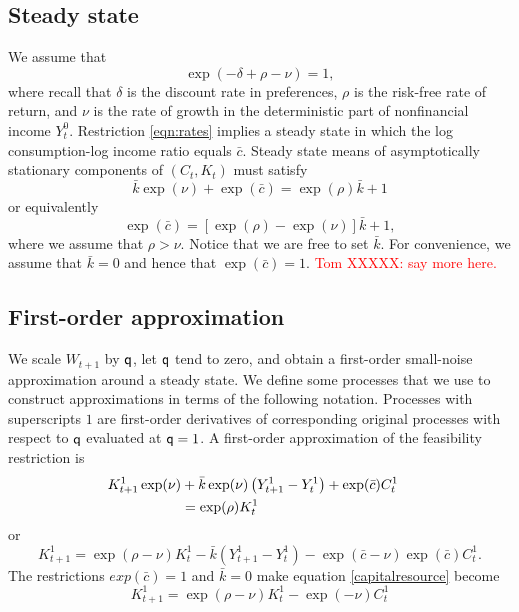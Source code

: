 \documentclass[12pt]{article}
\begin{document}
\subsection{Steady state}

We assume that
\begin{equation}\label{eqn:rates}
\exp(-\delta + \rho - \nu) = 1,
\end{equation}
where recall that $\delta$ is the discount rate in preferences, $\rho$ is the risk-free  rate of return, and $\nu$ is the rate of growth in the deterministic
part of nonfinancial income $Y_t^0$.  Restriction \eqref{eqn:rates} implies  a steady state in  which the  log consumption-log income ratio equals  ${\bar c}$.
Steady state means of asymptotically stationary components of $(C_t, K_t)$ must satisfy
\[
{\bar k}\exp(\nu) + \exp({\bar c})  = \exp(\rho) {\bar k} + 1
\]
or equivalently
\[
 \exp({\bar c}) = \left[\exp( \rho) - \exp(\nu)\right] {\bar k} + 1 ,
\]
where we assume that $\rho > \nu$.  Notice that we are free to set ${\bar k}$.
For convenience, we assume that ${\bar k} = 0$ and hence that $\exp({\bar c}) = 1$.
\textcolor{red}{Tom XXXXX: say more here.}

\subsection{First-order approximation}
We  scale $W_{t+1}$ by ${\sf q}$, let ${\sf q }$ tend to zero, and obtain a first-order small-noise approximation around a steady state.
We define some processes that we use to construct approximations in terms of the following notation.  Processes with superscripts $1$ are  first-order derivatives of corresponding original processes  with respect to ${\sf q}$ evaluated at ${\sf q}=1$.  A first-order approximation of
the feasibility restriction is 
\begin{align*}
K_{t+1}^1\exp(\nu) &+ {\bar k}\exp(\nu)\left(Y_{t+1}^1 - Y_t^1 \right)  + \exp({\bar c})  C_{t}^1 \cr & = \exp(\rho) K_t^1
\end{align*}
or
\begin{equation}\label{capitalresource}
K_{t+1}^1 = \exp(\rho - \nu)K_t^1  - {\bar k} \left( Y_{t+1}^1 - Y_t^1 \right) - \exp({\bar c} -\nu)\exp({\bar c})  C_{t}^1 .
\end{equation}
The restrictions $exp(\bar c) =1$ and   ${\bar k} = 0$ make  equation \eqref{capitalresource} become
\begin{equation}\label{logevolve}
K_{t+1}^1 = \exp(\rho - \nu)K_t^1 -   \exp( - \nu) C_{t}^1
\end{equation}
\end{document}
